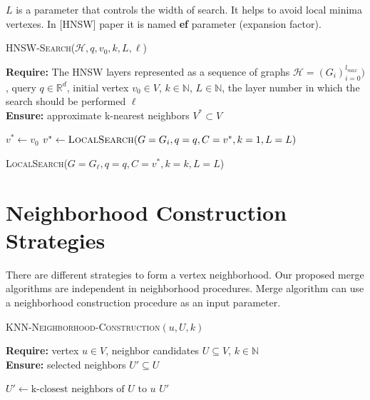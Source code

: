 \documentclass{article}
\begin{document}
$L$ is a parameter that controls the width of search. 
It helps to avoid local minima vertexes. In [HNSW] paper it is named \textbf{ef} parameter (expansion factor). 



\begin{algorithm}
\caption{\textsc{HNSW-Search}($\mathcal{H}, q, v_0, k, L, \ell $)}\label{alg:hnsw_search}
\textbf{Require:} The HNSW layers represented as  a sequence of graphs $\mathcal{H} = (G_i)_{i=0}^{l_{max}} )$, query $q \in \mathbb{R}^d$, initial vertex $v_0 \in V$,  $k \in \mathbb{N}$, $L \in \mathbb{N}$, the layer number in which the search should be performed $\ell$ \\    
\textbf{Ensure:} approximate k-nearest neighbors $V^* \subset V$
\begin{algorithmic}[1]

\State $v^* \gets v_0$ 
    \State $v^* \gets \textsc{LocalSearch}(G=G_i, q=q, C={v^*}, k=1, L=L)$
\EndFor

\State \Return \textsc{LocalSearch}($ G=G_{\ell}, q=q, C={v^*}, k=k, L=L$)
\end{algorithmic}
\end{algorithm}

\section {Neighborhood Construction Strategies}

There are different strategies to form a vertex neighborhood. Our proposed merge algorithms are independent in neighborhood procedures. Merge algorithm can use a neighborhood construction procedure as an input parameter.

\begin{algorithm}
\caption{\textsc{KNN-Neighborhood-Construction}$(u,U, k)$}
\label{alg:knntrategy}
\textbf{Require:} vertex $u \in V$, neighbor candidates $U \subseteq V$, $k \in \mathbb{N} $\\
\textbf{Ensure:} selected neighbors $U' \subseteq U$
\begin{algorithmic}[1]
    
    \State $U' \gets \text{k-closest neighbors of } U \text{ to } u$
    \State \Return $U'$
\end{algorithmic}
\end{algorithm}
\end{document}
